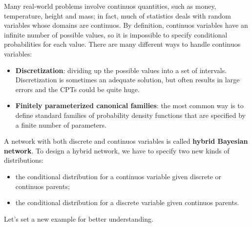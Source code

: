 Many real-world problems involve continuos quantities, such as money, temperature, height and mass; in fact, much of statistics deals with random variables
whose domains are continuos. By definition, continuos variables have an infinite number of possible values, so it is impossible to specify conditional
probabilities for each value. There are many different ways to handle continuos variables:
\begin{itemize}
    \renewcommand{\labelitemi}{-}
    \item \textbf{Discretization}: dividing up the possible values into a set of intervals. Discretization is sometimes an adequate solution, but often results in 
    large errors and the CPTs could be quite huge.
    \item \textbf{Finitely parameterized canonical families}: the most common way is to define standard families of probability density functions that are specified
    by a finite number of parameters. 
\end{itemize}
A network with both discrete and continuos variables is called \textbf{hybrid Bayesian network}. To design a hybrid network, we have to specify two new kinds of 
distributions:
\begin{itemize}
    \renewcommand{\labelitemi}{-}
    \item the conditional distribution for a continuos variable given discrete or continuos parents;
    \item the conditional distribution for a discrete variable given continuos parents.
\end{itemize}
Let's set a new example for better understanding.
